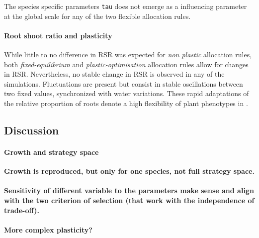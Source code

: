 The species specific parameters \texttt{tau} does not emerge as a influencing parameter at the global scale for any of the two flexible allocation rules.

\paragraph{Root shoot ratio and plasticity}

While little to no difference in RSR was expected for \textit{non plastic} allocation rules, both \textit{fixed-equilibrium} and \textit{plastic-optimisation} allocation rules allow for changes in RSR. Nevertheless, no stable change in RSR is observed in any of the simulations. Fluctuations are present but consist in stable oscillations between two fixed values, synchronized with water variations. These rapid adaptations of the relative proportion of roots denote a high flexibility of plant phenotypes in \model.



\subsection{Discussion}

\paragraph{Growth and strategy space}

\textbf{Growth is reproduced, but only for one species, not full strategy space.}

\paragraph{}

\textbf{Sensitivity of different variable to the parameters make sense and align with the two criterion of selection (that work with the independence of trade-off).}

\paragraph{More complex plasticity?}

